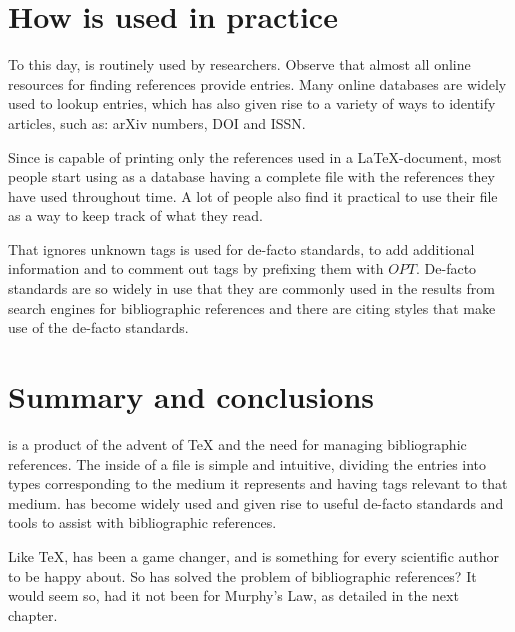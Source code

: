 \section{How {\bibtex} is used in practice}
\label{sec:how_bibtex_is_used_today}

To this day, {\bibtex} is routinely used by researchers.  Observe that
almost all online resources for finding references provide {\bibtex}
entries.  Many online databases are widely used to lookup entries,
which has also given rise to a variety of ways to identify articles,
such as: arXiv numbers, DOI and ISSN.

Since {\bibtex} is capable of printing only the references used in a
{\LaTeX}-document, most people start using {\bibtex} as a database
having a complete file with the references they have used throughout
time.  A lot of people also find it practical to use their {\bibtex}
file as a way to keep track of what they read.

That {\bibtex} ignores unknown tags is used for de-facto standards, to
add additional information and to comment out tags by prefixing them
with $OPT$.  De-facto standards are so widely in use that they are
commonly used in the results from search engines for bibliographic
references and there are citing styles that make use of the de-facto
standards.


\section{Summary and conclusions}
\label{sec:about_conclusion}


{\bibtex} is a product of the advent of {\TeX} and the need for
managing bibliographic references.  The inside of a {\bibtex} file is
simple and intuitive, dividing the entries into types corresponding
to the medium it represents and having tags relevant to that medium.
{\bibtex} has become widely used and given rise to useful de-facto
standards and tools to assist with bibliographic references.

Like {\TeX}, {\bibtex} has been a game changer, and is something for
every scientific author to be happy about.  So has {\bibtex} solved the
problem of bibliographic references? It would seem so, had it not been
for Murphy's Law, as detailed in the next chapter.


%
